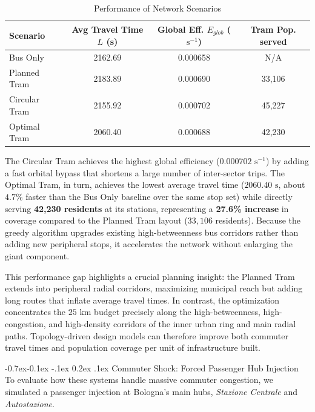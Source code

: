 \documentclass[12pt, a4paper]{article}
\makeatletter
\renewcommand\subsubsection{\@startsection{subsubsection}{3}{\z@}%
                                     {-0.7ex\@plus -0.1ex \@minus -.1ex}%
                                     {0.2ex \@plus .1ex}%
                                     {\normalfont\normalsize\bfseries}}
\makeatother
\begin{document}
\begin{table}[!htbp]
    \centering
    \footnotesize
    \caption{Performance of Network Scenarios}
    \label{tab:tram_optimization}
    \setlength{\tabcolsep}{6pt}
    \begin{tabular}{lccc}
        \toprule
        Scenario & Avg Travel Time $L$ (s) & Global Eff. $E_{glob}$ ($\text{s}^{-1}$) & Tram Pop. served \\
        \midrule
        Bus Only & 2162.69 & 0.000658 & N/A \\
        Planned Tram & 2183.89 & 0.000690 & 33,106 \\
        Circular Tram & 2155.92 & 0.000702 & 45,227 \\
        Optimal Tram & 2060.40 & 0.000688 & 42,230 \\
        \bottomrule
    \end{tabular}
\end{table}

The Circular Tram achieves the highest global efficiency ($0.000702\text{ s}^{-1}$) by adding a fast orbital bypass that shortens a large number of inter-sector trips. The Optimal Tram, in turn, achieves the lowest average travel time ($2060.40\text{ s}$, about $4.7\%$ faster than the Bus Only baseline over the same stop set) while directly serving \textbf{42,230 residents} at its stations, representing a \textbf{27.6\% increase} in coverage compared to the Planned Tram layout ($33,106$ residents). Because the greedy algorithm upgrades existing high-betweenness bus corridors rather than adding new peripheral stops, it accelerates the network without enlarging the giant component.

This performance gap highlights a crucial planning insight: the Planned Tram extends into peripheral radial corridors, maximizing municipal reach but adding long routes that inflate average travel times. In contrast, the optimization concentrates the $25\text{ km}$ budget precisely along the high-betweenness, high-congestion, and high-density corridors of the inner urban ring and main radial paths. Topology-driven design models can therefore improve both commuter travel times and population coverage per unit of infrastructure built.

\subsubsection{Commuter Shock: Forced Passenger Hub Injection}
To evaluate how these systems handle massive commuter congestion, we simulated a passenger injection at Bologna's main hubs, \textit{Stazione Centrale} and \textit{Autostazione}.
\end{document}

